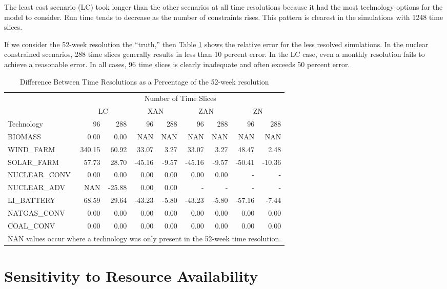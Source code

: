 The least cost scenario (LC) took longer than the other scenarios at all time
resolutions because it had the most technology options for the model to consider.
Run time tends to decrease as the number of constraints rises. This pattern is
clearest in the simulations with 1248 time slices.

If we consider the 52-week resolution the ``truth,'' then Table \ref{tab:relative_error}
shows the relative error for the less resolved simulations. In the nuclear constrained
scenarios, 288 time slices generally results in less than 10 percent error. In the
LC case, even a monthly resolution fails to achieve a reasonable error. In all cases,
96 time slices is clearly inadequate and often exceeds 50 percent error.

\begin{table}[H]
  \centering
  \caption{Difference Between Time Resolutions as a Percentage of the 52-week resolution}
  \label{tab:relative_error}
\begin{tabular}{lrr|rr|rr|rr}
  \toprule
    & \multicolumn{8}{c}{Number of Time Slices}\\
    & \multicolumn{2}{c}{LC} & \multicolumn{2}{c}{XAN} & \multicolumn{2}{c}{ZAN} & \multicolumn{2}{c}{ZN}\\
    Technology & 96 & 288 & 96 & 288 & 96 & 288 & 96 & 288\\
    \midrule
    BIOMASS &0.00&0.00&NAN&NAN&NAN&NAN& NAN & NAN\\
    WIND\_FARM &340.15&60.92&33.07&3.27&33.07&3.27& 48.47 & 2.48\\
    SOLAR\_FARM &57.73&28.70&-45.16&-9.57&-45.16&-9.57& -50.41 & -10.36\\
    NUCLEAR\_CONV &0.00&0.00&0.00&0.00&0.00&0.00& - & -\\
    NUCLEAR\_ADV &NAN&-25.88&0.00&0.00&-&-& - & - \\
    LI\_BATTERY &68.59&29.64&-43.23&-5.80&-43.23&-5.80&-57.16&-7.44\\
    NATGAS\_CONV &0.00&0.00&0.00&0.00&0.00&0.00&0.00&0.00\\
    COAL\_CONV &0.00&0.00&0.00&0.00&0.00&0.00&0.00&0.00\\
    \bottomrule
    \multicolumn{9}{p{12.25cm}}{\small{NAN values occur where a technology was only present in the 52-week time resolution.}}
  \end{tabular}
\end{table}

\section{Sensitivity to Resource Availability}

